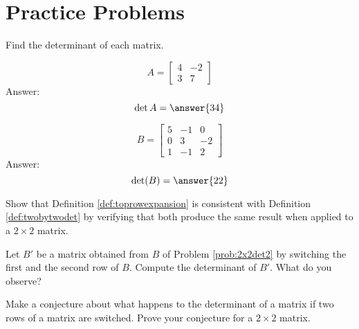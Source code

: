 \documentclass{ximera}
\begin{document}

\section*{Practice Problems}

\begin{problem}
Find the determinant of each matrix.
  \begin{problem}\label{prob:2x2det1}
  $$A=\begin{bmatrix}4&-2\\3&7\end{bmatrix}$$
  Answer:
  $$\det{A}=\answer{34}$$
  \end{problem}
  
  \begin{problem}\label{prob:2x2det2}
  $$B=\begin{bmatrix}5&-1&0\\0&3&-2\\1&-1&2\end{bmatrix}$$
  Answer:
  $$\text{det}(B)=\answer{22}$$
  \end{problem}
\end{problem}

\begin{problem}\label{prob:toprowexp2x2}
Show that Definition \ref{def:toprowexpansion} is consistent with Definition \ref{def:twobytwodet} by verifying that both produce the same result when applied to a $2\times 2$ matrix.
\end{problem}

\begin{problem}\label{prob:detrowswitch}
Let $B'$ be a matrix obtained from $B$ of Problem \ref{prob:2x2det2} by switching the first and the second row of $B$.  Compute the determinant of $B'$.  What do you observe?
\end{problem}

\begin{problem}\label{prob:2x2rowswitchproof}
Make a conjecture about what happens to the determinant of a matrix if two rows of a matrix are switched.  Prove your conjecture for a $2\times 2$ matrix.
\end{problem}
\end{document}
